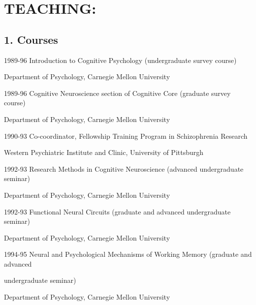 \documentclass[10 pt]{article}
\begin{document}
\section*{TEACHING:} \label{secTEACHING}
    \smallskip

\subsection*{1. Courses} \label{secTEACHING1}
    \medskip

1989-96 \hspace{0.3in} Introduction to Cognitive Psychology (undergraduate survey course)

\hspace{0.81in} Department of Psychology, Carnegie Mellon University
    \smallskip

1989-96 \hspace{0.3in} Cognitive Neuroscience section of Cognitive Core (graduate survey course)

\hspace{0.81in} Department of Psychology, Carnegie Mellon University
    \smallskip

1990-93 \hspace{0.3in} Co-coordinator, Fellowship Training Program in Schizophrenia Research

\hspace{0.81in} Western Psychiatric Institute and Clinic, University of Pittsburgh
    \smallskip

1992-93 \hspace{0.3in} Research Methods in Cognitive Neuroscience (advanced undergraduate seminar)

\hspace{0.81in} Department of Psychology, Carnegie Mellon University
    \smallskip

1992-93 \hspace{0.3in} Functional Neural Circuits (graduate and advanced undergraduate seminar)

\hspace{0.81in} Department of Psychology, Carnegie Mellon University
    \smallskip

1994-95 \hspace{0.3in} Neural and Psychological Mechanisms of Working Memory (graduate and advanced

\hspace{0.81in} undergraduate seminar)

\hspace{0.81in} Department of Psychology, Carnegie Mellon University
    \smallskip
\end{document}
